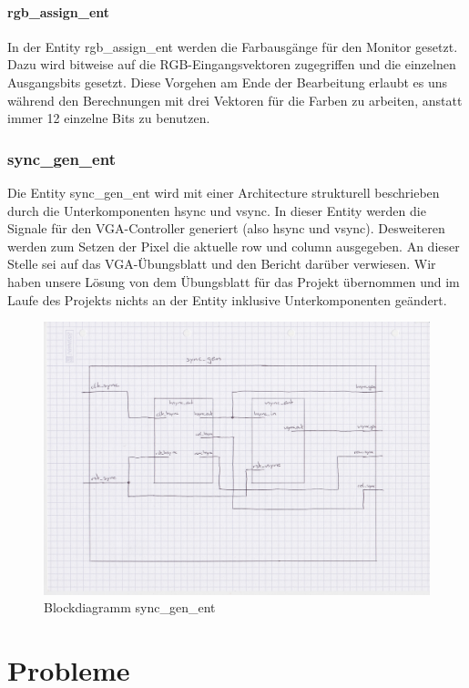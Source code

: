 \documentclass[parskip=full]{scrartcl}
\begin{document}
			\subsection{rgb\_assign\_ent}
				In der Entity rgb\_assign\_ent werden die Farbausgänge für den Monitor gesetzt. Dazu wird bitweise auf die RGB-Eingangsvektoren zugegriffen und die einzelnen Ausgangsbits gesetzt. Diese Vorgehen am Ende der Bearbeitung erlaubt es uns während den Berechnungen mit drei Vektoren für die Farben zu arbeiten, anstatt immer 12 einzelne Bits zu benutzen.
		
		\section{sync\_gen\_ent}
			Die Entity sync\_gen\_ent wird mit einer Architecture strukturell beschrieben durch die Unterkomponenten hsync und vsync. In dieser Entity werden die Signale für den VGA-Controller generiert (also hsync und vsync). Desweiteren werden zum Setzen der Pixel die aktuelle row und column ausgegeben.
			An dieser Stelle sei auf das VGA-Übungsblatt und den Bericht darüber verwiesen. Wir haben unsere Lösung von dem Übungsblatt für das Projekt übernommen und im Laufe des Projekts nichts an der Entity inklusive Unterkomponenten geändert.
			\begin{figure}[H]
				\centering
				\includegraphics[scale=0.1]{./bilder/Sync_gen.jpeg}
				\caption{Blockdiagramm sync\_gen\_ent}
			\end{figure}
		
	\part{Probleme}
\end{document}
